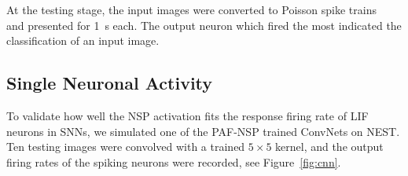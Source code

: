 	At the testing stage, the input images were converted to Poisson spike trains~\citep{liu2016bench} and presented for 1~s each.
	The output neuron which fired the most indicated the classification of an input image.
%	
%	

	
	\subsection{Single Neuronal Activity}
	\label{subsec:compareAF}
	To validate how well the NSP activation fits the response firing rate of LIF neurons in SNNs, we simulated one of the PAF-NSP trained ConvNets on NEST.
	Ten testing images were convolved with a trained $5\times5$ kernel, and the output firing rates of the spiking neurons were recorded, see Figure~\ref{fig:cnn}.

